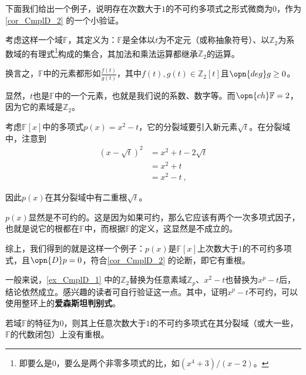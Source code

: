 下面我们给出一个例子，说明存在次数大于$1$的不可约多项式之形式微商为$0$，作为\autoref{cor_CmplD_2} 的一个小验证。





\begin{example}{}\label{ex_CmplD_1}

考虑这样一个域$\mathbb{F}$，其定义为：$\mathbb{F}$是全体以$t$为不定元（或称抽象符号）、以$\mathbb{Z}_2$为系数域的有理式\footnote{即要么是$0$，要么是两个非零多项式的比，如$(x^4+3)/(x-2)$。}构成的集合，其加法和乘法运算都继承$\mathbb{Z}_2$的运算。

换言之，$\mathbb{F}$中的元素都形如$\frac{f(t)}{g(t)}$，其中$f(t), g(t)\in\mathbb{Z}_2[t]$且$\opn{deg}g\geq 0$。

显然，$t$也是$\mathbb{F}$中的一个元素，也就是我们说的系数、数字等。而$\opn{ch}\mathbb{F}=2$，因为它的素域是$\mathbb{Z}_2$。

考虑$\mathbb{F}[x]$中的多项式$p(x) = x^2-t$，它的分裂域要引入新元素$\sqrt{t}$。在分裂域中，注意到
\begin{equation}
\begin{aligned}
(x-\sqrt{t})^2&=x^2+t-2\sqrt{t}\\
&=x^2+t\\
&=x^2-t~,
\end{aligned}
\end{equation}

因此$p(x)$在其分裂域中有二重根$\sqrt{t}$。

$p(x)$显然是不可约的。这是因为如果可约，那么它应该有两个一次多项式因子，也就是说它的根都在$\mathbb{F}$中，而根据$\mathbb{F}$的定义，这显然是不成立的。

综上，我们得到的就是这样一个例子：$p(x)$是$\mathbb{F}[x]$上次数大于$1$的不可约多项式，且$\opn{D}p=0$，符合\autoref{cor_CmplD_2} 的论断，即它有重根。

\end{example}

一般来说，\autoref{ex_CmplD_1} 中的$\mathbb{Z}_2$替换为任意素域$\mathbb{Z}_p$、$x^2-t$也替换为$x^p-t$后，结论依然成立。感兴趣的读者可自行验证这一点。其中，证明$x^p-t$不可约，可以使用整环上的\textbf{爱森斯坦判别式}。

\begin{corollary}{}\label{cor_CmplD_3}

若域$\mathbb{F}$的特征为$0$，则其上任意次数大于$1$的不可约多项式在其分裂域（或大一些，$\mathbb{F}$的代数闭包）上没有重根。

\end{corollary}

